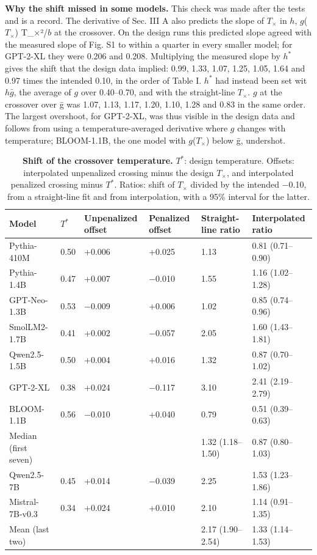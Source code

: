 \documentclass[aps,prx,onecolumn,superscriptaddress,longbibliography]{revtex4-2}
\begin{document}
\textbf{Why the shift missed in some models.} This check was made after the tests and is a record. The derivative of Sec. III A also predicts the slope of \(T_{\times}\) in \(h\), \(g\)(\(T_{\times}\)) T\_×²/\(b\) at the crossover. On the design runs this predicted slope agreed with the measured slope of Fig. S1 to within a quarter in every smaller model; for GPT-2-XL they were 0.206 and 0.208. Multiplying the measured slope by \(h^*\) gives the shift that the design data implied: 0.99, 1.33, 1.07, 1.25, 1.05, 1.64 and 0.97 times the intended 0.10, in the order of Table I. \(h^*\) had instead been set wit\(h\bar{g}\), the average of \(g\) over 0.40--0.70, and with the straight-line \(T_{\times}\). \(g\) at the crossover over ḡ was 1.07, 1.13, 1.17, 1.20, 1.10, 1.28 and 0.83 in the same order. The largest overshoot, for GPT-2-XL, was thus visible in the design data and follows from using a temperature-averaged derivative where \(g\) changes with temperature; BLOOM-1.1B, the one model with \(g\)(\(T_{\times}\)) below ḡ, undershot.

\begin{table}[htbp]
\centering
\small
\setlength{\tabcolsep}{6pt}
\renewcommand{\thetable}{F8}
\caption{\textbf{Shift of the crossover temperature.} \(T^*\): design temperature. Offsets: interpolated unpenalized crossing minus the design \(T_{\times}\), and interpolated penalized crossing minus \(T^*\). Ratios: shift of \(T_{\times}\) divided by the intended −0.10, from a straight-line fit and from interpolation, with a 95\% interval for the latter.}
\label{tabF8}
\begin{tabular}{@{}llllll@{}}
\toprule
Model & \(T^*\) & Unpenalized offset & Penalized offset & Straight-line ratio & Interpolated ratio \\
\midrule
Pythia-410M & 0.50 & +0.006 & +0.025 & 1.13 & 0.81 (0.71--0.90) \\
Pythia-1.4B & 0.47 & +0.007 & −0.010 & 1.55 & 1.16 (1.02--1.28) \\
GPT-Neo-1.3B & 0.53 & −0.009 & +0.006 & 1.02 & 0.85 (0.74--0.96) \\
SmolLM2-1.7B & 0.41 & +0.002 & −0.057 & 2.05 & 1.60 (1.43--1.81) \\
Qwen2.5-1.5B & 0.50 & +0.004 & +0.016 & 1.32 & 0.87 (0.70--1.02) \\
GPT-2-XL & 0.38 & +0.024 & −0.117 & 3.10 & 2.41 (2.19--2.79) \\
BLOOM-1.1B & 0.56 & −0.010 & +0.040 & 0.79 & 0.51 (0.39--0.63) \\
Median (first seven) & & & & 1.32 (1.18--1.50) & 0.87 (0.80--1.03) \\
Qwen2.5-7B & 0.45 & +0.014 & −0.039 & 2.25 & 1.53 (1.23--1.86) \\
Mistral-7B-v0.3 & 0.34 & +0.024 & +0.010 & 2.10 & 1.14 (0.91--1.35) \\
Mean (last two) & & & & 2.17 (1.90--2.54) & 1.33 (1.14--1.53) \\
\bottomrule
\end{tabular}
\end{table}
\end{document}
